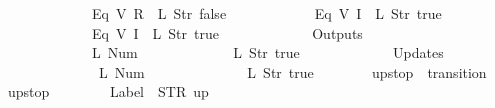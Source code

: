 \begin{isabellebody}
\ \ \ \ \ \ \ \ \ \ \ \ {\isacharparenleft}Eq\ {\isacharparenleft}V\ {\isacharparenleft}R\ {}{\isacharparenright}{\isacharparenright}\ {\isacharparenleft}L\ {\isacharparenleft}Str\ {\isacharprime}{\isacharprime}false{\isacharprime}{\isacharprime}{\isacharparenright}{\isacharparenright}{\isacharparenright}{\isacharcomma}\isanewline
\ \ \ \ \ \ \ \ \ \ \ \ {\isacharparenleft}Eq\ {\isacharparenleft}V\ {\isacharparenleft}I\ {}{\isacharparenright}{\isacharparenright}\ {\isacharparenleft}L\ {\isacharparenleft}Str\ {\isacharprime}{\isacharprime}true{\isacharprime}{\isacharprime}{\isacharparenright}{\isacharparenright}{\isacharparenright}{\isacharcomma}\isanewline
\ \ \ \ \ \ \ \ \ \ \ \ {\isacharparenleft}Eq\ {\isacharparenleft}V\ {\isacharparenleft}I\ {}{\isacharparenright}{\isacharparenright}\ {\isacharparenleft}L\ {\isacharparenleft}Str\ {\isacharprime}{\isacharprime}true{\isacharprime}{\isacharprime}{\isacharparenright}{\isacharparenright}{\isacharparenright}\isanewline
\ \ \ \ \ \ {\isacharbrackright}{\isacharcomma}\isanewline
\ \ \ \ \ \ Outputs\ {\isacharequal}\ {\isacharbrackleft}\isanewline
\ \ \ \ \ \ \ \ \ \ \ \ {\isacharparenleft}L\ {\isacharparenleft}Num\ {}{\isacharparenright}{\isacharparenright}{\isacharcomma}\isanewline
\ \ \ \ \ \ \ \ \ \ \ \ {\isacharparenleft}L\ {\isacharparenleft}Str\ {\isacharprime}{\isacharprime}true{\isacharprime}{\isacharprime}{\isacharparenright}{\isacharparenright}\isanewline
\ \ \ \ \ \ {\isacharbrackright}{\isacharcomma}\isanewline
\ \ \ \ \ \ Updates\ {\isacharequal}\ {\isacharbrackleft}\isanewline
\ \ \ \ \ \ \ \ \ \ \ \ {\isacharparenleft}{}{\isacharcomma}\ {\isacharparenleft}L\ {\isacharparenleft}Num\ {}{\isacharparenright}{\isacharparenright}{\isacharparenright}{\isacharcomma}\isanewline
\ \ \ \ \ \ \ \ \ \ \ \ {\isacharparenleft}{}{\isacharcomma}\ {\isacharparenleft}L\ {\isacharparenleft}Str\ {\isacharprime}{\isacharprime}true{\isacharprime}{\isacharprime}{\isacharparenright}{\isacharparenright}{\isacharparenright}\isanewline
\ \ \ \ \ \ {\isacharbrackright}\isanewline
{\isasymrparr}{\isachardoublequoteclose}\isanewline
\isanewline
{}\isamarkupfalse%
\ {\isachardoublequoteopen}up{}{}stop{\isachardoublequoteclose}\ {\isacharcolon}{\isacharcolon}\ {\isachardoublequoteopen}transition{\isachardoublequoteclose}\ \isanewline
{\isachardoublequoteopen}up{}{}stop\ {\isasymequiv}\ {\isasymlparr}\isanewline
\ \ \ \ \ \ Label\ {\isacharequal}\ STR\ {\isacharprime}{\isacharprime}up{\isacharprime}{\isacharprime}{\isacharcomma}\isanewline

\end{isabellebody}
